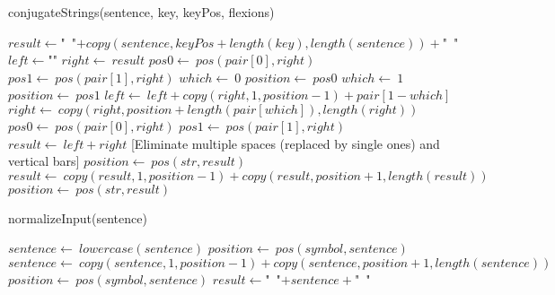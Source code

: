 \documentclass[a4paper,10pt]{article}
\begin{document}
\begin{algorithm}
\caption{conjugateStrings(sentence, key, keyPos, flexions)}
\begin{algorithmic}[5]

  \STATE \(result\gets\)"{}\ "{}\(+copy(sentence,keyPos+length(key),length(sentence))+\)"{}\ "{}\(\)
    \STATE \(left\gets\)"{}"{}\(\)
    \STATE \(right\gets\ result\)
    \STATE \(pos0\gets\ pos(pair[0],right)\)
    \STATE \(pos1\gets\ pos(pair[1],right)\)
      \STATE \(which\gets\ 0\)
      \STATE \(position\gets\ pos0\)
        \STATE \(which\gets\ 1\)
        \STATE \(position\gets\ pos1\)
      \ENDIF
      \STATE \(left\gets\ left+copy(right,1,position-1)+pair[1-which]\)
      \STATE \(right\gets\ copy(right,position+length(pair[which]),length(right))\)
      \STATE \(pos0\gets\ pos(pair[0],right)\)
      \STATE \(pos1\gets\ pos(pair[1],right)\)
    \ENDWHILE
    \STATE \(result\gets\ left+right\)
  \ENDFOR
  [Eliminate multiple spaces (replaced by single ones) and vertical bars]
    \STATE \(position\gets\ pos(str,result)\)
      \STATE \(result\gets\ copy(result,1,position-1)+copy(result,position+1,length(result))\)
      \STATE \(position\gets\ pos(str,result)\)
    \ENDWHILE
  \ENDFOR

\end{algorithmic}
\end{algorithm}


\begin{algorithm}
\caption{normalizeInput(sentence)}
\begin{algorithmic}[5]

\STATE {}
\STATE {}
\STATE {}
  \STATE \(sentence\gets\ lowercase(sentence)\)
    \STATE \(position\gets\ pos(symbol,sentence)\)
      \STATE \(sentence\gets\ copy(sentence,1,position-1)+copy(sentence,position+1,length(sentence))\)
      \STATE \(position\gets\ pos(symbol,sentence)\)
    \ENDWHILE
  \ENDFOR
  \STATE \(result\gets\)"{}\ "{}\(+sentence+\)"{}\ "{}\(\)

\end{algorithmic}
\end{algorithm}
\end{document}
